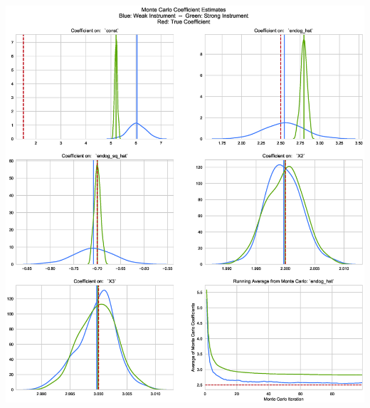 \documentclass[12pt]{article}
\begin{document}
\begin{center}
\includegraphics[width=1\linewidth]{figures/MC_strong_and_weak.eps}
\end{center}
\end{document}
